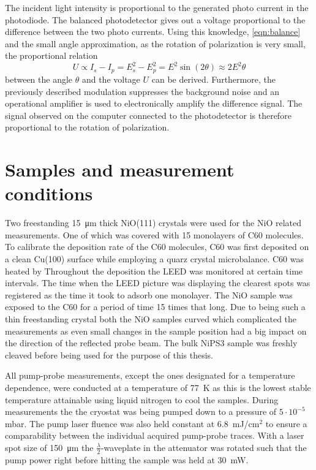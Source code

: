 The incident light intensity is proportional to the generated photo current in the photodiode.
The balanced photodetector gives out a voltage proportional to the difference between the two photo currents.
Using this knowledge, \autoref{eqn:balance} and the small angle approximation, as the rotation of polarization is very small, the proportional relation
\begin{equation}
    U \propto I_s - I_p = E_s^2 - E_p^2 = E^2 \sin(2\theta) \approx 2 E^2 \theta 
\end{equation}
between the angle $\theta$ and the voltage $U$ can be derived.
Furthermore, the previously described modulation suppresses the background noise and an operational amplifier is used to electronically amplify the difference signal.
The signal observed on the computer connected to the photodetector is therefore proportional to the rotation of polarization.

\section{Samples and measurement conditions}
Two freestanding \qty{15}{\um} thick NiO(111) crystals were used for the NiO related measurements.
One of which was covered with 15 monolayers of C60 molecules.
To calibrate the deposition rate of the C60 molecules, C60 was first deposited on a clean Cu(100) surface while employing a quarz crystal microbalance.
C60 was heated by
Throughout the deposition the LEED was monitored at certain time intervals.
The time when the LEED picture was displaying the clearest spots was registered as the time it took to adsorb one monolayer.
The NiO sample was exposed to the C60 for a period of time 15 times that long.
Due to being such a thin freestanding crystal both the NiO samples curved which complicated the measurements as even small changes in the sample position had a big impact on the direction of the reflected probe beam.
The bulk NiPS3 sample was freshly cleaved before being used for the purpose of this thesis.

All pump-probe measurements, except the ones designated for a temperature dependence, were conducted at a temperature of \qty{77}{K} as this is the lowest stable temperature attainable using liquid nitrogen to cool the samples.
During measurements the the cryostat was being pumped down to a pressure of $5 \cdot 10^{-5}\,$mbar.
The pump laser fluence was also held constant at \qty{6.8}{mJ/cm}$^2$ to ensure a comparability between the individual acquired pump-probe traces.
With a laser spot size of \qty{150}{\um} the $\frac{\lambda}{2}$-waveplate in the attenuator was rotated such that the pump power right before hitting the sample was held at \qty{30}{mW}.
